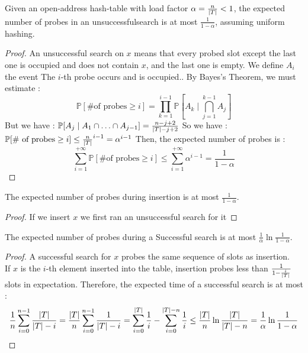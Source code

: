 \documentclass{cours}
\begin{document}
\begin{theorem}[Analysis]
    Given an open-address hash-table with load factor $\alpha = \frac{n}{\left|T\right|} < 1$, the expected number of probes in an unsuccessfulsearch is at most $\frac{1}{1-\alpha}$, assuming uniform hashing. 
\end{theorem}
\begin{proof}
    An unsuccessful search on $x$ means that every probed slot except the last one is occupied and does not contain $x$, and the last one is empty. 
    We define $A_{i}$ the event \og The $i$-th probe occurs and is occupied.\fg. By Bayes's Theorem, we must estimate : 
    \[
        \mathbb{P}[\text{\# of probes} \geq i] = \prod_{k = 1}^{i - 1} \mathbb{P}[A_{k} \mid \bigcap\limits_{j = 1}^{k - 1} A_{j}]
    \]
    But we have : $\mathbb{P}[A_{j}\mid A_{1} \cap \ldots \cap A_{j - 1}] = \frac{n - j + 2}{\left|T\right| - j + 2}$
    So we have : $\mathbb{P}[\text{\# of probes} \geq i] \leq \frac{n}{\left|T\right|}^{i - 1} = \alpha^{i - 1}$
    Then, the expected number of probes is : 
    \[
        \sum_{i = 1}^{+\infty} \mathbb{P}[\text{\# of probes} \geq i] \leq \sum_{i = 1}^{+\infty} \alpha^{i - 1} = \frac{1}{1 - \alpha}
    \]
\end{proof}
\begin{corollary}
    The expected number of probes during insertion is at most $\frac{1}{1 - \alpha}$.
\end{corollary}
\begin{proof}
    If we insert $x$ we first ran an unsuccessful search for it
\end{proof}

\begin{theorem}
    The expected number of probes during a Successful search is at most $\frac{1}{\alpha}\ln\frac{1}{1- \alpha}$.
\end{theorem}
\begin{proof}
    A successful search for $x$ probes the same sequence of slots as insertion.\\
    If $x$ is the $i$-th element inserted into the table, insertion probes less than $\frac{1}{1 - \frac{i}{\left|T\right|}}$ slots in expectation.
    Therefore, the expected time of a successful search is at most : 
    \[
        \frac{1}{n}\sum_{i = 0}^{n - 1}\frac{\left|T\right|}{\left|T\right| - i} = \frac{\left|T\right|}{n}\sum_{i = 0}^{n - 1}\frac{1}{\left|T\right| - i} = \sum_{i = 0}^{\left|T\right|}\frac{1}{i} - \sum_{i = 0}^{\left|T\right|-n} \frac{1}{i} \leq \frac{\left|T\right|}{n}\ln\frac{\left|T\right|}{\left|T\right| - n} = \frac{1}{\alpha}\ln\frac{1}{1 - \alpha}
    \]
\end{proof}
\end{document}

